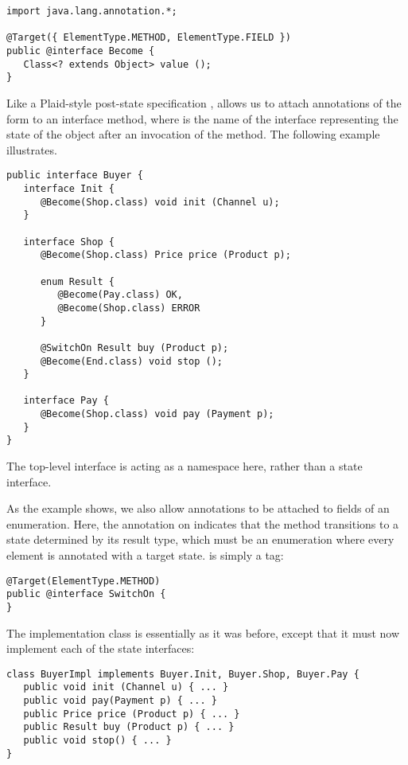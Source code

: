\begin{lstlisting}
import java.lang.annotation.*;

@Target({ ElementType.METHOD, ElementType.FIELD })
public @interface Become {
   Class<? extends Object> value ();
}
\end{lstlisting}

\noindent Like a Plaid-style post-state specification \cite{garcia14},
 allows us to attach annotations of the form
 to an interface method, where 
is the name of the interface representing the state of the object
after an invocation of the method. The following example illustrates.

\begin{lstlisting}
public interface Buyer {
   interface Init {
      @Become(Shop.class) void init (Channel u);
   }

   interface Shop {
      @Become(Shop.class) Price price (Product p);

      enum Result {
         @Become(Pay.class) OK,
         @Become(Shop.class) ERROR
      }

      @SwitchOn Result buy (Product p);
      @Become(End.class) void stop ();
   }

   interface Pay {
      @Become(Shop.class) void pay (Payment p);
   }
}
\end{lstlisting}

\noindent The top-level  interface is acting as a
namespace here, rather than a state interface.

As the example shows, we also allow  annotations to be
attached to fields of an enumeration. Here, the 
annotation on  indicates that the method transitions to a
state determined by its result type, which must be an enumeration
where every element is annotated with a target state. 
is simply a tag:
\begin{lstlisting}
@Target(ElementType.METHOD)
public @interface SwitchOn {
}
\end{lstlisting}

The implementation class  is essentially as it was
before, except that it must now implement each of the state
interfaces:

\begin{lstlisting}
class BuyerImpl implements Buyer.Init, Buyer.Shop, Buyer.Pay {
   public void init (Channel u) { ... }
   public void pay(Payment p) { ... }
   public Price price (Product p) { ... }
   public Result buy (Product p) { ... }
   public void stop() { ... }
}
\end{lstlisting}

